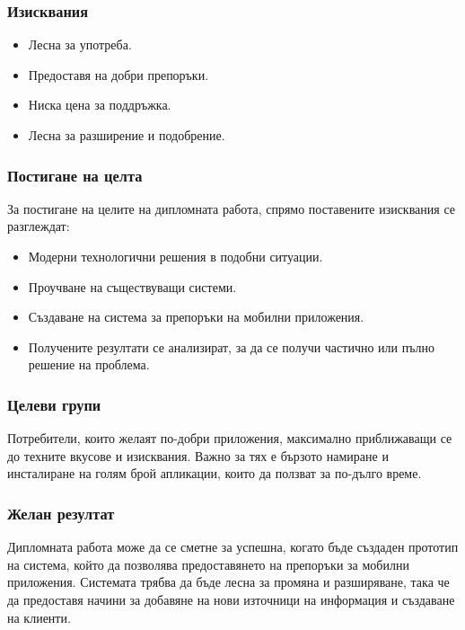 	\subsubsection{Изисквания}

		\begin{itemize}
			\item Лесна за употреба.
			\item Предоставя на добри препоръки.
			\item Ниска цена за поддръжка.
			\item Лесна за разширение и подобрение.
		\end{itemize}

	\subsubsection{Постигане на целта}

		За постигане на целите на дипломната работа, спрямо поставените изисквания се разглеждат:
		
		\begin{itemize}
			\item Модерни технологични решения в подобни ситуации.
			\item Проучване на съществуващи системи.
			\item Създаване на система за препоръки на мобилни приложения.
			\item Получените резултати се анализират, за да се получи частично или пълно решение на проблема.
		\end{itemize}

	\subsubsection{Целеви групи}
	
		Потребители, които желаят по-добри приложения, максимално приближаващи се до техните вкусове и изисквания. Важно за тях е бързото намиране и инсталиране на голям брой апликации, които да ползват за по-дълго време.
	
	\subsubsection{Желан резултат}
	
		Дипломната работа може да се сметне за успешна, когато бъде създаден прототип на система, който да позволява 
		предоставянето на препоръки за мобилни приложения. Системата трябва да бъде лесна за промяна и разширяване,
		така че да предоставя начини за добавяне на нови източници на информация и създаване на клиенти.
	
